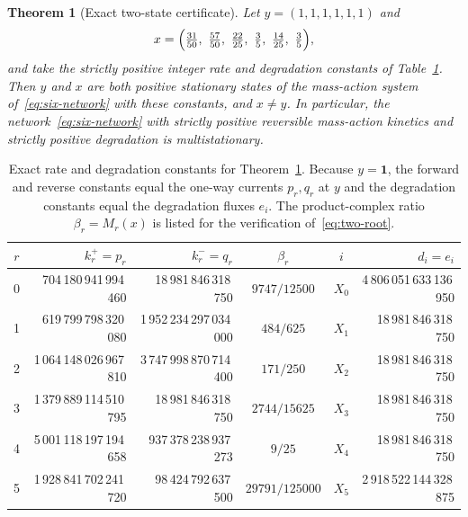 \documentclass[11pt,reqno]{amsart}
\theoremstyle{plain}
\newtheorem{theorem}{Theorem}[section]
\theoremstyle{definition}
\theoremstyle{remark}
\numberwithin{equation}{section}
\newcommand{\one}{\mathbf{1}}
\begin{document}
\begin{theorem}[Exact two-state certificate]\label{thm:sixspecies}
Let $y=(1,1,1,1,1,1)$ and
\begin{equation}\label{eq:six-x}
x=\Bigl(\tfrac{31}{50},\ \tfrac{57}{50},\ \tfrac{22}{25},\ \tfrac35,\ \tfrac{14}{25},\ \tfrac35\Bigr),
\end{equation}
and take the strictly positive integer rate and degradation constants of Table~\ref{tab:six}.  Then $y$ and $x$ are both positive stationary states of the mass-action system of~\eqref{eq:six-network} with these constants, and $x\ne y$.  In particular, the network~\eqref{eq:six-network} with strictly positive reversible mass-action kinetics and strictly positive degradation is multistationary.
\end{theorem}

\begin{table}[ht]
\centering
\caption{Exact rate and degradation constants for Theorem~\ref{thm:sixspecies}.  Because $y=\one$, the forward and reverse constants equal the one-way currents $p_r,q_r$ at $y$ and the degradation constants equal the degradation fluxes $e_i$.  The product-complex ratio $\beta_r=M_r(x)$ is listed for the verification of~\eqref{eq:two-root}.}
\label{tab:six}
\small
\begin{tabular}{@{}c r r c@{\qquad}c r@{}}
\toprule
$r$ & $k_r^+=p_r$ & $k_r^-=q_r$ & $\beta_r$ & $i$ & $d_i=e_i$\\
\midrule
0 & 704\,180\,941\,994\,460 & 18\,981\,846\,318\,750 & $9747/12500$ & $X_0$ & 4\,806\,051\,633\,136\,950\\
1 & 619\,799\,798\,320\,080 & 1\,952\,234\,297\,034\,000 & $484/625$ & $X_1$ & 18\,981\,846\,318\,750\\
2 & 1\,064\,148\,026\,967\,810 & 3\,747\,998\,870\,714\,400 & $171/250$ & $X_2$ & 18\,981\,846\,318\,750\\
3 & 1\,379\,889\,114\,510\,795 & 18\,981\,846\,318\,750 & $2744/15625$ & $X_3$ & 18\,981\,846\,318\,750\\
4 & 5\,001\,118\,197\,194\,658 & 937\,378\,238\,937\,273 & $9/25$ & $X_4$ & 18\,981\,846\,318\,750\\
5 & 1\,928\,841\,702\,241\,720 & 98\,424\,792\,637\,500 & $29791/125000$ & $X_5$ & 2\,918\,522\,144\,328\,875\\
\bottomrule
\end{tabular}
\end{table}
\end{document}
